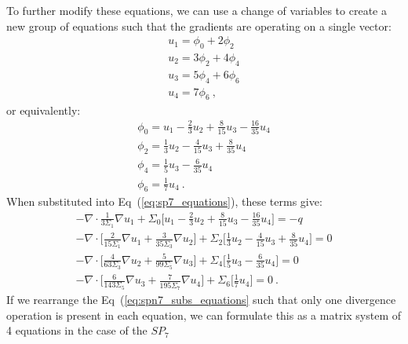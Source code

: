 \documentclass[letterpaper,12pt]{article}
\begin{document}
To further modify these equations, we can use a change of variables to
create a new group of equations such that the gradients are operating
on a single vector:
\begin{subequations}
  \begin{gather}
    u_1 = \phi_0 + 2\phi_2 \\
    u_2 = 3\phi_2 + 4\phi_4 \\
    u_3 = 5\phi_4 + 6\phi_6 \\
    u_4 = 7\phi_6 \:,
  \end{gather}
  \label{eq:spn7_subs}
\end{subequations}
or equivalently:
\begin{subequations}
  \begin{gather}
    \phi_0 = u_1 - \frac{2}{3}u_2 + \frac{8}{15}u_3 -
    \frac{16}{35}u_4 \\
    \phi_2 = \frac{1}{3}u_2 - \frac{4}{15}u_3 + \frac{8}{35}u_4\\ 
    \phi_4 = \frac{1}{5}u_3 - \frac{6}{35}u_4\\
    \phi_6 = \frac{1}{7}u_4\:.
  \end{gather}
  \label{eq:spn7_subs_inverse}
\end{subequations}
When substituted into Eq~(\ref{eq:sp7_equations}), these terms give:
\begin{subequations}
  \begin{gather}
    -\nabla \cdot \frac{1}{3 \Sigma_1} \nabla u_1 + \Sigma_0 \Bigg[
    u_1 - \frac{2}{3}u_2 + \frac{8}{15}u_3 - \frac{16}{35}u_4 \Bigg]
    = -q \\
    -\nabla \cdot \Bigg[ \frac{2}{15 \Sigma_1} \nabla u_1 +
    \frac{3}{35 \Sigma_3} \nabla u_2 \Bigg] + \Sigma_2 \Bigg[
    \frac{1}{3}u_2 - \frac{4}{15}u_3 + \frac{8}{35}u_4 \Bigg] = 0 \\
    -\nabla \cdot \Bigg[ \frac{4}{63 \Sigma_3} \nabla u_2 +
    \frac{5}{99 \Sigma_5} \nabla u_3 \Bigg] + \Sigma_4 \Bigg[
    \frac{1}{5}u_3 - \frac{6}{35}u_4 \Bigg] = 0 \\ 
    -\nabla \cdot \Bigg[ \frac{6}{143 \Sigma_5} \nabla u_3 +
    \frac{7}{195 \Sigma_7} \nabla u_4 \Bigg] + \Sigma_6 \Bigg[
    \frac{1}{7}u_4 \Bigg] = 0 \:.
  \end{gather}
  \label{eq:spn7_subs_equations}
\end{subequations}
If we rearrange the Eq~(\ref{eq:spn7_subs_equations} such that only
one divergence operation is present in each equation, we can formulate
this as a matrix system of 4 equations in the case of the $SP_7$
\end{document}

